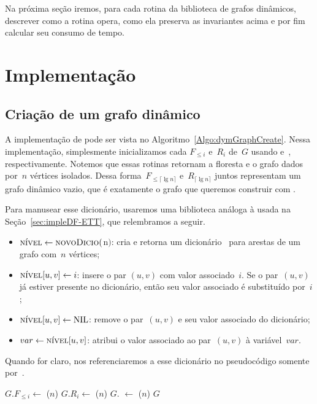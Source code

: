 Na próxima seção iremos, para cada rotina da biblioteca de grafos dinâmicos, descrever como a rotina opera, como ela preserva as invariantes acima e por fim calcular seu consumo de tempo.

\section{Implementação}
\subsection{Criação de um grafo dinâmico}

A implementação de \dymGraphCreate{} pode ser vista no Algoritmo~\ref{Algo:dymGraphCreate}. Nessa implementação, simplesmente inicializamos cada $F_{\leqslant i}$ e~$R_i$ de~$G$ usando \dymForestCreate{} e~\graphCreate{}, respectivamente. Notemos que essas rotinas retornam a floresta e o grafo dados por~$n$ vértices isolados. Dessa forma~$F_{\leqslant \lceil \lg n \rceil}$ e~$R_{\lceil \lg n \rceil}$ juntos representam um grafo dinâmico vazio, que é exatamente o grafo que queremos construir com \dymGraphCreate{}.


Para manusear esse dicionário, usaremos uma biblioteca análoga à usada na Seção~\ref{sec:impleDF-ETT}, que relembramos a seguir.

\begin{itemize}
    \item $\nivel \gets \hashCreate($n$)$: cria e retorna um dicionário~\nivel{} para arestas de um grafo com~$n$ vértices;
    \item $\nivel[u,v] \gets i$: insere o par $(u,v)$ com valor associado~$i$. Se o par~$(u,v)$ já estiver presente no dicionário, então seu valor associado é substituído por~$i$;
    \item $\nivel[u,v] \gets \Nil$: remove o par~$(u,v)$ e seu valor associado do dicionário;
    \item $var \gets \nivel[u,v]$: atribui o valor associado ao par~$(u,v)$ à variável~$var$.
\end{itemize}

Quando for claro, nos referenciaremos a esse dicionário no pseudocódigo somente por~\nivel.

\begin{algorithm}
\caption{\dymGraphCreate($n$)}
\label{Algo:dymGraphCreate}
\begin{algorithmic}[1]
\State $G.F_{\leqslant i} \gets$ \dymForestCreate($n$)
\State $G.R_i \gets$ \graphCreate($n$)
\EndFor
\State $G$.\nivel{} $\gets$ \hashCreate($n$)
\State \Return $G$ 
\end{algorithmic}
\end{algorithm}

